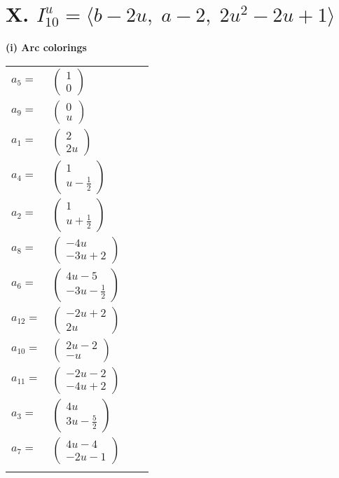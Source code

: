 \documentclass[1p]{elsarticle_modified}
\theoremstyle{definition}
\begin{document}
\centering \section*{X. $I^u_{10}= \langle b-2 u,\;a-2,\;2 u^2-2 u+1 \rangle$}
\flushleft \textbf{(i) Arc colorings}\\
\begin{tabular}{m{7pt} m{180pt} m{7pt} m{180pt} }
\flushright $a_{5}=$&$\begin{pmatrix}1\\0\end{pmatrix}$ \\
\flushright $a_{9}=$&$\begin{pmatrix}0\\u\end{pmatrix}$ \\
\flushright $a_{1}=$&$\begin{pmatrix}2\\2 u\end{pmatrix}$ \\
\flushright $a_{4}=$&$\begin{pmatrix}1\\u-\frac{1}{2}\end{pmatrix}$ \\
\flushright $a_{2}=$&$\begin{pmatrix}1\\u+\frac{1}{2}\end{pmatrix}$ \\
\flushright $a_{8}=$&$\begin{pmatrix}-4 u\\-3 u+2\end{pmatrix}$ \\
\flushright $a_{6}=$&$\begin{pmatrix}4 u-5\\-3 u-\frac{1}{2}\end{pmatrix}$ \\
\flushright $a_{12}=$&$\begin{pmatrix}-2 u+2\\2 u\end{pmatrix}$ \\
\flushright $a_{10}=$&$\begin{pmatrix}2 u-2\\- u\end{pmatrix}$ \\
\flushright $a_{11}=$&$\begin{pmatrix}-2 u-2\\-4 u+2\end{pmatrix}$ \\
\flushright $a_{3}=$&$\begin{pmatrix}4 u\\3 u-\frac{5}{2}\end{pmatrix}$ \\
\flushright $a_{7}=$&$\begin{pmatrix}4 u-4\\-2 u-1\end{pmatrix}$\\&\end{tabular}
\end{document}

